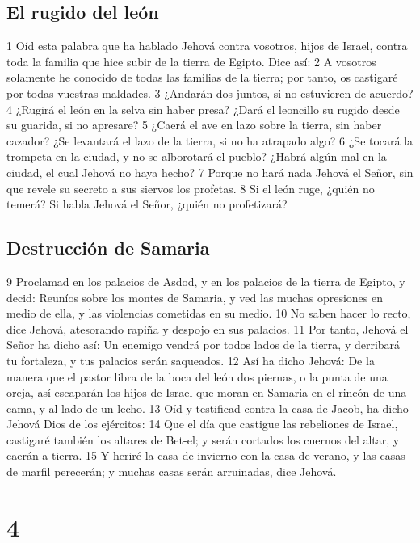 \section*{El rugido del león}

1 Oíd esta palabra que ha hablado Jehová contra vosotros, hijos de Israel, contra toda la familia que hice subir de la tierra de Egipto. Dice así:
2 A vosotros solamente he conocido de todas las familias de la tierra; por tanto, os castigaré por todas vuestras maldades.
3 ¿Andarán dos juntos, si no estuvieren de acuerdo?
4 ¿Rugirá el león en la selva sin haber presa? ¿Dará el leoncillo su rugido desde su guarida, si no apresare?
5 ¿Caerá el ave en lazo sobre la tierra, sin haber cazador? ¿Se levantará el lazo de la tierra, si no ha atrapado algo?
6 ¿Se tocará la trompeta en la ciudad, y no se alborotará el pueblo? ¿Habrá algún mal en la ciudad, el cual Jehová no haya hecho?
7 Porque no hará nada Jehová el Señor, sin que revele su secreto a sus siervos los profetas.
8 Si el león ruge, ¿quién no temerá? Si habla Jehová el Señor, ¿quién no profetizará?

\section*{Destrucción de Samaria}

9 Proclamad en los palacios de Asdod, y en los palacios de la tierra de Egipto, y decid: Reuníos sobre los montes de Samaria, y ved las muchas opresiones en medio de ella, y las violencias cometidas en su medio.
10 No saben hacer lo recto, dice Jehová, atesorando rapiña y despojo en sus palacios.
11 Por tanto, Jehová el Señor ha dicho así: Un enemigo vendrá por todos lados de la tierra, y derribará tu fortaleza, y tus palacios serán saqueados.
12 Así ha dicho Jehová: De la manera que el pastor libra de la boca del león dos piernas, o la punta de una oreja, así escaparán los hijos de Israel que moran en Samaria en el rincón de una cama, y al lado de un lecho.
13 Oíd y testificad contra la casa de Jacob, ha dicho Jehová Dios de los ejércitos:
14 Que el día que castigue las rebeliones de Israel, castigaré también los altares de Bet-el; y serán cortados los cuernos del altar, y caerán a tierra.
15 Y heriré la casa de invierno con la casa de verano, y las casas de marfil perecerán; y muchas casas serán arruinadas, dice Jehová.

\chapter{4}

